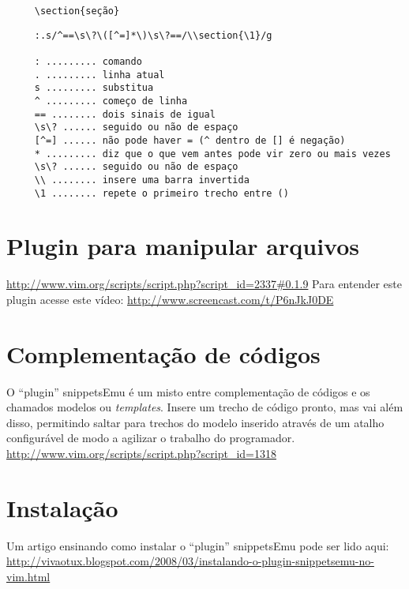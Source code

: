 \begin{verbatim}
     \section{seção}
\end{verbatim}

\begin{verbatim}
     :.s/^==\s\?\([^=]*\)\s\?==/\\section{\1}/g
     
     : ......... comando
     . ......... linha atual
     s ......... substitua
     ^ ......... começo de linha
     == ........ dois sinais de igual
     \s\? ...... seguido ou não de espaço
     [^=] ...... não pode haver = (^ dentro de [] é negação)
     * ......... diz que o que vem antes pode vir zero ou mais vezes
     \s\? ...... seguido ou não de espaço
     \\ ........ insere uma barra invertida
     \1 ........ repete o primeiro trecho entre ()
\end{verbatim}

\section{Plugin para manipular arquivos}
\url{http://www.vim.org/scripts/script.php?script_id=2337#0.1.9}
Para entender este plugin acesse este vídeo:
 \url{http://www.screencast.com/t/P6nJkJ0DE}


\section{Complementação de códigos}
\label{Complementação de códigos}

O ``plugin'' snippetsEmu é um misto entre complementação de códigos e
os chamados modelos ou {\em templates}. Insere um trecho de código pronto,
mas vai além disso, permitindo saltar para trechos do modelo inserido
através de um atalho configurável de modo a agilizar o trabalho do
programador. \url{http://www.vim.org/scripts/script.php?script\_id=1318}

\section{Instalação}
\label{Instalação}

Um artigo ensinando como instalar o ``plugin'' snippetsEmu pode ser lido aqui:
 \url{http://vivaotux.blogspot.com/2008/03/instalando-o-plugin-snippetsemu-no-vim.html}

